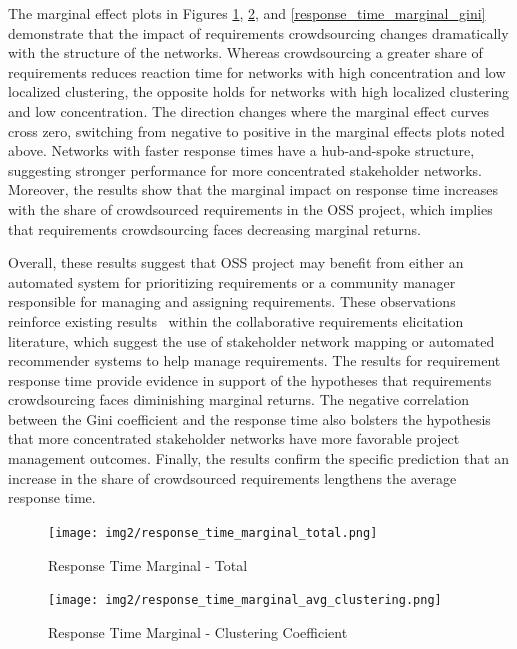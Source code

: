 The marginal effect plots in Figures \ref{response_time_marginal_total}, \ref{response_time_marginal_clustering}, and \ref{response_time_marginal_gini} demonstrate that the impact of requirements crowdsourcing changes dramatically with the structure of the networks. Whereas crowdsourcing a greater share of requirements reduces reaction time for networks with high concentration and low localized clustering, the opposite holds for networks with high localized clustering and low concentration. The direction changes where the marginal effect curves cross zero, switching from negative to positive in the marginal effects plots noted above. Networks with faster response times have a hub-and-spoke structure, suggesting stronger performance for more concentrated stakeholder networks. Moreover, the results show that the marginal impact on response time increases with the share of crowdsourced requirements in the OSS project, which implies that requirements crowdsourcing faces decreasing marginal returns. 

Overall, these results suggest that OSS project may benefit from either an automated system for prioritizing requirements or a community manager responsible for managing and assigning requirements. These observations reinforce existing results~\cite{stakesource, stakerare, lim, mobasher} within the collaborative requirements elicitation literature, which suggest the use of stakeholder network mapping or automated recommender systems to help manage requirements. The results for requirement response time provide evidence in support of the hypotheses that requirements crowdsourcing faces diminishing marginal returns. The negative correlation between the Gini coefficient and the response time also bolsters the hypothesis that more concentrated stakeholder networks have more favorable project management outcomes. Finally, the results confirm the specific prediction that an increase in the share of crowdsourced requirements lengthens the average response time.

\begin{figure}
  \texttt{[image: img2/response\_time\_marginal\_total.png]}
\caption{Response Time Marginal - Total}
\label{response_time_marginal_total}
\end{figure}

\begin{figure}
  \texttt{[image: img2/response\_time\_marginal\_avg\_clustering.png]}
\caption{Response Time Marginal - Clustering Coefficient}
\label{response_time_marginal_clustering}
\end{figure}


